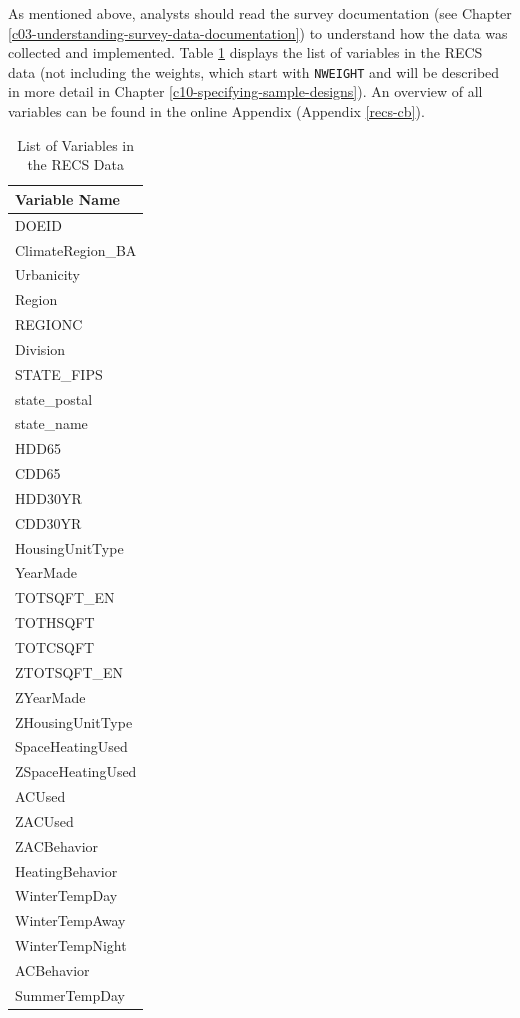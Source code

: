 \documentclass[
]{krantz}
\begin{document}
As mentioned above, analysts should read the survey documentation (see Chapter \ref{c03-understanding-survey-data-documentation}) to understand how the data was collected and implemented. Table \ref{tab:recs-view-tab} displays the list of variables in the RECS data (not including the weights, which start with \texttt{NWEIGHT} and will be described in more detail in Chapter \ref{c10-specifying-sample-designs}). An overview of all variables can be found in the online Appendix (Appendix \ref{recs-cb}).



\begin{longtable}{l}
\caption{\label{tab:recs-view-tab}List of Variables in the RECS Data}\\
\toprule
Variable Name \\ 
\midrule
DOEID \\ 
ClimateRegion\_BA \\ 
Urbanicity \\ 
Region \\ 
REGIONC \\ 
Division \\ 
STATE\_FIPS \\ 
state\_postal \\ 
state\_name \\ 
HDD65 \\ 
CDD65 \\ 
HDD30YR \\ 
CDD30YR \\ 
HousingUnitType \\ 
YearMade \\ 
TOTSQFT\_EN \\ 
TOTHSQFT \\ 
TOTCSQFT \\ 
ZTOTSQFT\_EN \\ 
ZYearMade \\ 
ZHousingUnitType \\ 
SpaceHeatingUsed \\ 
ZSpaceHeatingUsed \\ 
ACUsed \\ 
ZACUsed \\ 
ZACBehavior \\ 
HeatingBehavior \\ 
WinterTempDay \\ 
WinterTempAway \\ 
WinterTempNight \\ 
ACBehavior \\ 
SummerTempDay \\ 

\end{longtable}
\end{document}
